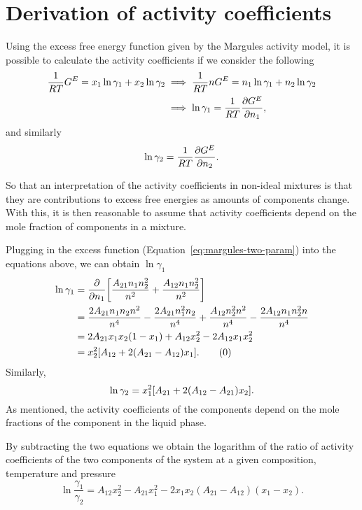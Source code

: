 \section{Derivation of activity coefficients}

Using the excess free energy function given by the Margules activity model, 
it is possible to calculate the activity coefficients if we consider the 
following
\begin{align*}
    \frac1{RT} G^E = x_1\ln\gamma_1 + x_2\ln\gamma_2 &\implies
    \frac1{RT}n G^E = n_1\ln\gamma_1 + n_2\ln\gamma_2 \\ &\implies
    \ln\gamma_1 = \frac1{RT} \pdv{G^E}{n_1},
\end{align*}
and similarly
\[
    \ln\gamma_2 = \frac1{RT} \pdv{G^E}{n_2}.
\]

So that an interpretation of the activity coefficients in non-ideal mixtures is
that they are contributions to excess free energies as amounts of components change.
With this, it is then reasonable to assume that activity coefficients depend on
the mole fraction of components in a mixture.

Plugging in the excess function (Equation~\ref{eq:margules-two-param}) into the
equations above, we can obtain $\ln\gamma_1$
\begin{align*}\label{eq:margules-act-1}
    \ln\gamma_1 &= \pdv{n_1} \qty[\dfrac{A_{21}n_1n_2^2}{n^2} + 
    \dfrac{A_{12}n_1n_2^2}{n^2}] \\
    &= \dfrac{2A_{21}n_1n_2n^2}{n^4} - \dfrac{2A_{21}n_1^2n_2}{n^4} +
    \dfrac{A_{12}n_2^2n^2}{n^4} - \dfrac{2A_{12}n_1n_2^2n}{n^4} \\
    &= 2A_{21}x_1x_2(1-x_1) + A_{12}x_2^2 - 2A_{12}x_1x_2^2 \\
    &= x_2^2 \qty[A_{12} + 2(A_{21} - A_{12})x_1]. \tag{\theequation}
\end{align*}
Similarly,
\begin{equation}\label{eq:margules-act-2}
    \ln\gamma_2 = x_1^2 \qty[A_{21} + 2(A_{12} - A_{21})x_2].
\end{equation}
As mentioned, the activity coefficients of the components depend on the mole 
fractions of the component in the liquid phase.

By subtracting the two equations we obtain the logarithm of the ratio of activity
coefficients of the two components of the system at a given composition, temperature
and pressure
\begin{equation}\label{eq:act-diff}
    \ln\dfrac{\gamma_1}{\gamma_2} = A_{12}x_2^2 - A_{21}x_1^2 - 2x_1x_2
    (A_{21} - A_{12})(x_1 - x_2).
\end{equation}

